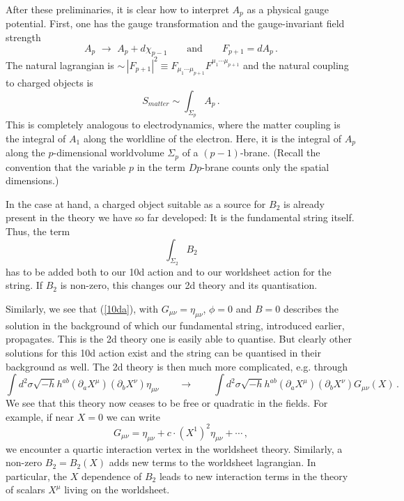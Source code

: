 \documentclass[12pt]{article}
\newcommand{\be}{\begin{equation}}
\newcommand{\ee}{\end{equation}}
\numberwithin{equation}{section}
\begin{document}
After these preliminaries, it is clear how to interpret $A_p$ as a physical gauge potential. First, one has the gauge transformation and the gauge-invariant field strength
\be
A_p\,\,\to\,\,A_p+d\chi_{p-1} \qquad \mbox{and} \qquad F_{p+1}=dA_p\,.
\ee
The natural lagrangian is $\sim\,|F_{p+1}|^2\equiv F_{\mu_1\cdots\mu_{p+1}} F^{\mu_1\cdots\mu_{p+1}}$ and the natural coupling to charged objects is 
\be
S_{matter}\sim \int_{\Sigma_p} A_p\,.
\ee
This is completely analogous to electrodynamics, where the matter coupling is the integral of $A_1$ along the worldline of the electron. Here, it is the integral of $A_p$ along the $p$-dimensional worldvolume $\Sigma_p$ of a $(p-1)$-brane. (Recall the convention that the variable $p$ in the term $Dp$-brane counts only the spatial dimensions.)

In the case at hand, a charged object suitable as a source for $B_2$ is already present in the theory we have so far developed: It is the fundamental string itself. Thus, the term
\be
\int_{\Sigma_2}B_2
\ee
has to be added both to our 10d action and to our worldsheet action for the string. If $B_2$ is non-zero, this changes our 2d theory and its quantisation. 

Similarly, we see that (\ref{10da}), with $G_{\mu\nu}=\eta_{\mu\nu}$, $\phi=0$ and $B=0$ describes the solution in the background of which our fundamental string, introduced earlier, propagates. This is the 2d theory one is easily able to quantise. But clearly other solutions for this 10d action exist and the string can be quantised in their background as well. The 2d theory is then much more complicated, e.g. through
\be
\int d^2\sigma \sqrt{-h}h^{ab}(\partial_a X^\mu)(\partial_b X^\nu)\eta_{\mu\nu} \qquad\to \qquad \int d^2\sigma \sqrt{-h}h^{ab} (\partial_a X^\mu)(\partial_b X^\nu)G_{\mu\nu}(X)\,.
\ee
We see that this theory now ceases to be free or quadratic in the fields. For example, if near $X=0$ we can write 
\be
G_{\mu\nu}=\eta_{\mu\nu}+c\cdot(X^1)^2\eta_{\mu\nu}+\cdots\,,
\ee
we encounter a quartic interaction vertex in the worldsheet theory. Similarly, a non-zero $B_2=B_2(X)$ adds new terms to the worldsheet lagrangian. In particular, the $X$ dependence of $B_2$ leads to new interaction terms in the theory of scalars $X^\mu$ living on the worldsheet.
\end{document}
